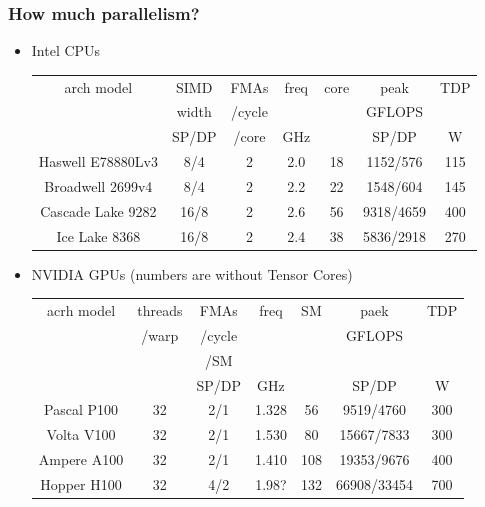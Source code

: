 \documentclass[12pt,dvipdfmx]{beamer}
\newcommand{\mura}[1]{{\color{purple}#1}}
\begin{document}
\begin{frame}
\frametitle{How much parallelism?}
\begin{itemize}
\item Intel CPUs

{\footnotesize
\begin{tabular}{|c|c|c|c|c|c|c|}\hline
arch       model             & SIMD & FMAs   & freq & core & peak      & TDP \\
                             & width& /cycle &      &      & GFLOPS    &     \\
                             & SP/DP& /core  & GHz  &      & SP/DP     & W   \\\hline
Haswell {\tiny E78880Lv3}    & 8/4  & 2      & 2.0  & 18   & 1152/576  & 115 \\
Broadwell {\tiny 2699v4}     & 8/4  & 2      & 2.2  & 22   & 1548/604  & 145 \\
Cascade Lake {\tiny 9282}    & 16/8 & 2  & 2.6  & 56   & 9318/4659 & 400 \\
\mura{Ice Lake {\tiny 8368}} & 16/8 & 2  & 2.4  & 38   & \mura{5836/2918} & 270 \\\hline
\end{tabular}}

\item NVIDIA GPUs (numbers are without Tensor Cores)

{\footnotesize
\begin{tabular}{|c|c|c|c|c|c|c|}\hline
acrh     model      & threads & FMAs   & freq  & SM       & paek   & TDP     \\
                    & /warp   & /cycle &       &          & GFLOPS &         \\
                    &         & /SM    &       &          &        &         \\
                    &         & SP/DP  & GHz   &          & SP/DP  & W       \\\hline
Pascal {\tiny P100} & 32  & 2/1 & 1.328 & 56  & 9519/4760  & 300     \\
Volta {\tiny V100}  & 32  & 2/1 & 1.530 & 80  & 15667/7833 & 300     \\
\mura{Ampere {\tiny A100}} & 32  & 2/1 & 1.410 & 108 & \mura{19353/9676} & 400     \\
Hopper {\tiny H100} & 32  & 4/2 & 1.98? & 132 & \mura{66908/33454} & 700     \\\hline
\end{tabular}}
\end{itemize}


\end{frame}
\end{document}
